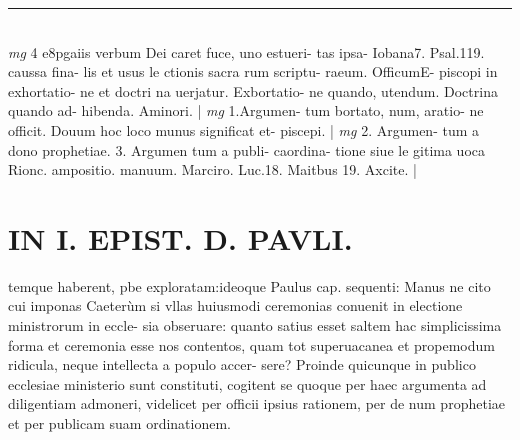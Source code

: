 \documentclass{article}
\begin{document}
\begin{pages}
\vspace{0.5cm}\noindent
\vspace{0.2cm}\rule{1cm}{0.2pt}\\ 
\hspace{0.2cm}\textit{mg}
\footnotesize 4 e8pgaiis verbum Dei caret fuce, uno estueri- tas ipsa- Iobana7. Psal.119. caussa fina- lis et usus le ctionis sacra rum scriptu- raeum. OfficumE- piscopi in exhortatio- ne et doctri na uerjatur. Exbortatio- ne quando, utendum. Doctrina quando ad- hibenda. Aminori. 
\normalsize| 
\hspace{0.2cm}\textit{mg}
\footnotesize 1.Argumen- tum bortato, num, aratio- ne officit. Douum hoc loco munus significat et- piscepi. 
\normalsize| 
\hspace{0.2cm}\textit{mg}
\footnotesize 2. Argumen- tum a dono prophetiae. 3. Argumen tum a publi- caordina- tione siue le gitima uoca Rionc. ampositio. manuum. Marciro. Luc.18. Maitbus 19. Axcite. 
\normalsize| 
\section*{IN I. EPIST. D. PAVLI. }
\marginpar{[ p.102 ]}\pstart temque haberent, pbe exploratam:ideoque Paulus cap. sequenti: Manus ne cito cui imponas  \pend\pstart Caeterùm si vllas huiusmodi ceremonias conuenit in electione ministrorum in eccle- sia obseruare: quanto satius esset saltem hac simplicissima forma et ceremonia esse nos contentos, quam tot superuacanea et propemodum ridicula, neque intellecta a populo accer- sere? Proinde quicunque in publico ecclesiae ministerio sunt constituti, cogitent se quoque  per haec argumenta ad diligentiam admoneri, videlicet per officii ipsius rationem, per de num prophetiae et per publicam suam ordinationem.  \pend
{}
{}

\end{pages}
\end{document}

